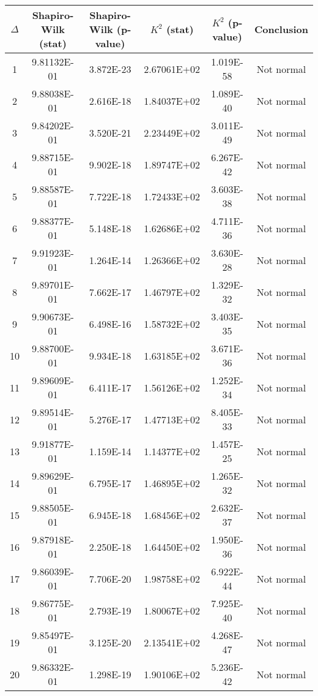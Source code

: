 \begin{table}[h]
	\begin{tabular}{|c|c|c|c|c|c|}
		\hline
		$\Delta$ &  Shapiro-Wilk (stat) & Shapiro-Wilk (p-value) & $K^2$ (stat) & $K^2$ (p-value) & Conclusion\\\hline
		\hline
		1 & 9.81132E-01 & 3.872E-23 & 2.67061E+02 & 1.019E-58 & Not normal\\\hline
		2 & 9.88038E-01 & 2.616E-18 & 1.84037E+02 & 1.089E-40 & Not normal\\\hline
		3 & 9.84202E-01 & 3.520E-21 & 2.23449E+02 & 3.011E-49 & Not normal\\\hline
		4 & 9.88715E-01 & 9.902E-18 & 1.89747E+02 & 6.267E-42 & Not normal\\\hline
		5 & 9.88587E-01 & 7.722E-18 & 1.72433E+02 & 3.603E-38 & Not normal\\\hline
		6 & 9.88377E-01 & 5.148E-18 & 1.62686E+02 & 4.711E-36 & Not normal\\\hline
		7 & 9.91923E-01 & 1.264E-14 & 1.26366E+02 & 3.630E-28 & Not normal\\\hline
		8 & 9.89701E-01 & 7.662E-17 & 1.46797E+02 & 1.329E-32 & Not normal\\\hline
		9 & 9.90673E-01 & 6.498E-16 & 1.58732E+02 & 3.403E-35 & Not normal\\\hline
		10 & 9.88700E-01 & 9.934E-18 & 1.63185E+02 & 3.671E-36 & Not normal\\\hline
		11 & 9.89609E-01 & 6.411E-17 & 1.56126E+02 & 1.252E-34 & Not normal\\\hline
		12 & 9.89514E-01 & 5.276E-17 & 1.47713E+02 & 8.405E-33 & Not normal\\\hline
		13 & 9.91877E-01 & 1.159E-14 & 1.14377E+02 & 1.457E-25 & Not normal\\\hline
		14 & 9.89629E-01 & 6.795E-17 & 1.46895E+02 & 1.265E-32 & Not normal\\\hline
		15 & 9.88505E-01 & 6.945E-18 & 1.68456E+02 & 2.632E-37 & Not normal\\\hline
		16 & 9.87918E-01 & 2.250E-18 & 1.64450E+02 & 1.950E-36 & Not normal\\\hline
		17 & 9.86039E-01 & 7.706E-20 & 1.98758E+02 & 6.922E-44 & Not normal\\\hline
		18 & 9.86775E-01 & 2.793E-19 & 1.80067E+02 & 7.925E-40 & Not normal\\\hline
		19 & 9.85497E-01 & 3.125E-20 & 2.13541E+02 & 4.268E-47 & Not normal\\\hline
		20 & 9.86332E-01 & 1.298E-19 & 1.90106E+02 & 5.236E-42 & Not normal\\\hline

\end{tabular}
\end{table}
